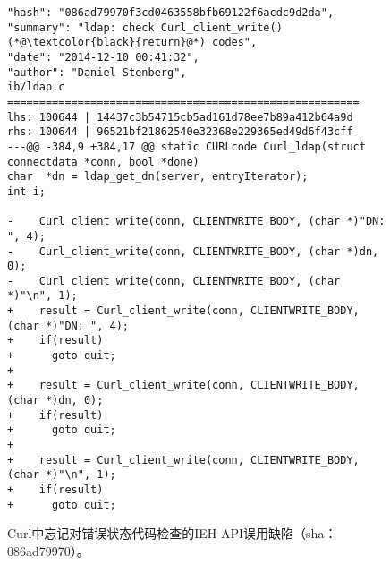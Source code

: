 \begin{figure}[b]
	\centering
\begin{lstlisting}
"hash": "086ad79970f3cd0463558bfb69122f6acdc9d2da",
"summary": "ldap: check Curl_client_write() (*@\textcolor{black}{return}@*) codes",
"date": "2014-12-10 00:41:32",
"author": "Daniel Stenberg",
ib/ldap.c
=======================================================
lhs: 100644 | 14437c3b54715cb5ad161d78ee7b89a412b64a9d
rhs: 100644 | 96521bf21862540e32368e229365ed49d6f43cff
---@@ -384,9 +384,17 @@ static CURLcode Curl_ldap(struct connectdata *conn, bool *done)
char  *dn = ldap_get_dn(server, entryIterator);
int i;

-    Curl_client_write(conn, CLIENTWRITE_BODY, (char *)"DN: ", 4);
-    Curl_client_write(conn, CLIENTWRITE_BODY, (char *)dn, 0);
-    Curl_client_write(conn, CLIENTWRITE_BODY, (char *)"\n", 1);
+    result = Curl_client_write(conn, CLIENTWRITE_BODY, (char *)"DN: ", 4);
+    if(result)
+      goto quit;
+
+    result = Curl_client_write(conn, CLIENTWRITE_BODY, (char *)dn, 0);
+    if(result)
+      goto quit;
+
+    result = Curl_client_write(conn, CLIENTWRITE_BODY, (char *)"\n", 1);
+    if(result)
+      goto quit;

\end{lstlisting}
	\caption{
	Curl中忘记对错误状态代码检查的IEH-API误用缺陷（sha：086ad79970）。
	}
	\label{fig:2-3-ieh-1}
\end{figure}